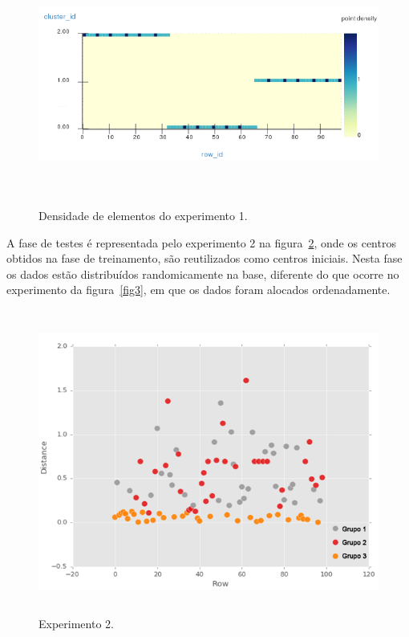 \begin{figure}[!h]
\centering
\includegraphics[width = 14cm, height = 8cm]{figuras/densidade1.png}
\caption{\scriptsize{Densidade de elementos do experimento 1.}}
\label{fig4}
\end{figure}
  
\newpage

\indent A fase de testes é representada pelo experimento 2 na figura~\ref{exp2}, onde os centros obtidos na fase de treinamento, são reutilizados como centros iniciais. Nesta fase os dados estão distribuídos randomicamente na base, diferente do que ocorre no experimento da figura~\ref{fig3}, em que os dados foram alocados ordenadamente.

\begin{figure}[!h]
\centering
\includegraphics[width = 13cm, height = 10cm]{figuras/aleatorio1.png}
\caption{\scriptsize{Experimento 2.}}
\label{exp2}
\end{figure}

